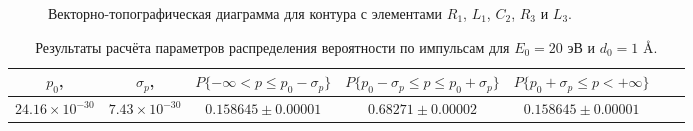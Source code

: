 \documentclass[12pt,a4paper]{article}
\begin{document}
\begin{figure}[H]
\begin{tikzpicture}[scale=1.2, >=stealth]
      \end{tikzpicture}
      \caption{Векторно-топографическая диаграмма для контура с элементами $R_1$, $L_1$, $C_2$, $R_3$ и $L_3$.}
      \label{fig:vector_diagram}
  \end{figure}
    
\begin{center}
  \begin{table}[H]
    \noindent
    \begin{tabularx}{\textwidth}{|C|C|C|C|C|C|C|}
		\hline
		$p_0$,  & $\sigma_p$,  & $P\{-\infty < p \leq p_0 - \sigma_p\}$ & $P\{p_0 - \sigma_p \leq p \leq p_0 + \sigma_p\}$ & $P\{p_0 + \sigma_p \leq p < +\infty\}$ \\
		\hline
		$24.16 \times 10^{-30}$ & $7.43 \times 10^{-30}$ & $0.158645 \pm 0.00001$ & $0.68271 \pm 0.00002$ & $0.158645 \pm 0.00001$ \\
		\hline
		\end{tabularx}
		\caption{Результаты расчёта параметров распределения вероятности по импульсам для $E_0 = 20$ эВ и $d_0 = 1$ Å.}
		\label{tab:lab2qmTask5part1}
	\end{table}
\end{center}
\end{document}
